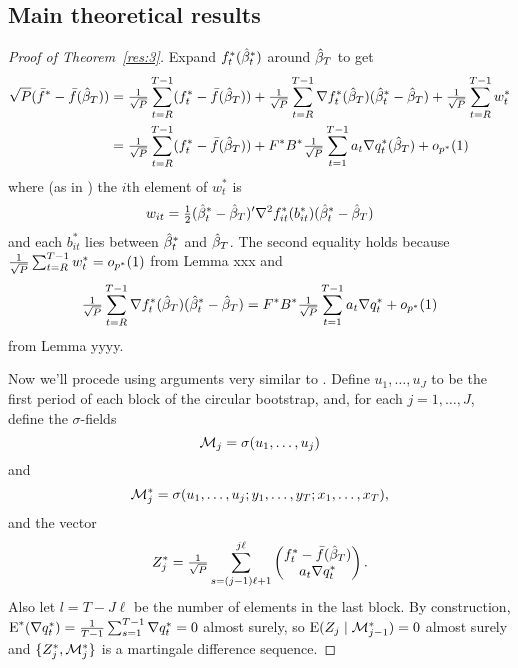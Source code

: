 \documentclass[12pt,fleqn]{article}
\begin{document}
\subsection{Main theoretical results}
\newcommand{\WesA}[1][]{\oclt{t}
  (F_t^{#1} - \E^{#1} F_t^{#1}) B^{#1} H_t^{#1}}
\newcommand{\WesB}[1][]{\tfrac{1}{\sqrt{P}} \E^{#1} F_t^{#1} \osum{t} (B_t^{#1} -
  B^{#1}) H_t^{#1}}
\newcommand{\WesC}[1][]{\oclt{t}
  (F_t^{#1} - \E^{#1} F_t^{#1}) (B_t^{#1} - B^{#1}) H_t^{#1}}
\begin{proof}[Proof of Theorem~\ref{res:3}]
  Expand $f_t^{*}(\hat \beta_t^*)$ around $\btrue[*]$
  to get
  \begin{align*}
    \sqrt{P} (\fb^* - \fb(\btrue[*]))
    &= \oclt{t} (f_t^{*} - \bar{f}(\btrue[*]))
     + \oclt{t} \nabla f_t^*(\btrue[*]) (\bh_t^* - \btrue[*])
     + \oclt{t} w_t^* \\
    &= \oclt{t} (f_t^{*} - \bar{f}(\btrue[*]))
     + F^* B^* \tfrac{1}{\sqrt{P}} \sum_{t=1}^{T-1} a_t \nabla q_t^*(\btrue[*]) + o_{p^*}(1)
  \end{align*}
  where (as in \citealp{Wes:96}) the $i$th element of $w_t^*$ is
  \begin{equation*}
    w_{it} = \tfrac12 (\bh_t^* - \btrue[*])' \nabla^2 f_{it}^*(b_{it}^*) (\bh_t^* - \btrue[*])
  \end{equation*}
  and each $b_{it}^*$ lies between $\hat \beta_t^*$ and $\btrue[*]$. The second equality holds because
  $\tfrac{1}{\sqrt{P}} \sum_{t=R}^{T-1} w_t^* = o_{p^*}(1)$ from Lemma xxx and
  \begin{equation*}
    \oclt{t} \nabla f_t^*(\btrue[*]) (\bh_t^* - \btrue[*])
    = F^* B^* \tfrac{1}{\sqrt{P}} \sum_{t=1}^{T-1} a_t \nabla q_t^* + o_{p^*}(1)
  \end{equation*}
  from Lemma yyyy.

  Now we'll procede using arguments very similar to
  \cite{Cal:14}. Define $u_1,\dots,u_J$ to be the first period of each
  block of the circular bootstrap, and, for each $j = 1,\dots,J$,
  define the $\sigma$-fields
  \[
  \mathcal{M}_j = \sigma(u_1,\dots,u_j)
  \]
  and
  \[
  \mathcal{M}_j^* = \sigma(u_1,\dots,u_j; y_1,\dots,y_T; x_1,\dots,x_T),
  \]
  and the vector
  \[
  Z_j^* = \tfrac{1}{\sqrt{P}} \sum_{s=(j-1) \ell + 1}^{j\ell}
  \begin{pmatrix}
    f_t^* - \fb(\btrue[*]) \\
    a_t \nabla q_t^*
  \end{pmatrix}.
  \]
  Also let $l = T - J \ell$ be the number of elements in the last block.
  By construction, $\operatorname{E}^*(\nabla q_t^*) = \tfrac{1}{T-1}
  \sum_{s=1}^{T-1} \nabla q_t^* = 0$ almost surely, so $\operatorname{E}(Z_j \mid
  \mathcal{M}_{j-1}^*) = 0$ almost surely and $\{Z_j^*, \mathcal{M}_j^*\}$ is a
  martingale difference sequence.


\end{proof}
\end{document}
